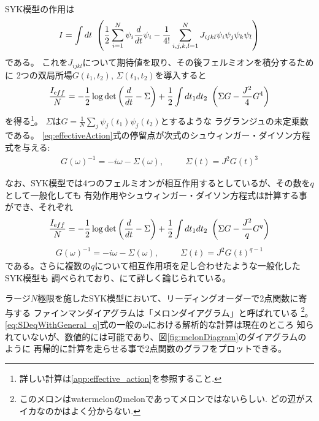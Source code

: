 SYK模型の作用は
\begin{align}
  I = \int dt\ \left(\frac{1}{2}\sum_{i = 1}^{N} \psi_i \frac{d}{dt} \psi_i
		- \frac{1}{4!} \sum_{i,j,k,l = 1}^{N} J_{ijkl} \psi_i\psi_j\psi_k\psi_l
    \right)
\end{align}
である。
これを$J_{ijkl}$について期待値を取り、その後フェルミオンを積分するために
2つの双局所場$G(t_1, t_2)$, $\Sigma(t_1, t_2)$を導入すると
\begin{align}
  \frac{I_{\mathrm eff}}{N} =
		- \frac{1}{2}\log\det\left(\frac{d}{dt} - \Sigma\right)
		+ \frac{1}{2}\int dt_1dt_2\ \left(\Sigma G - \frac{J^2}{4}G^4\right)
  \label{eq:effectiveAction}
\end{align}
を得る\footnote{詳しい計算は\ref{app:effective_action}を参照すること.}。
$\Sigma$は$G = \frac{1}{N}\sum_j \psi_j(t_1)\psi_j(t_2)$とするような
ラグランジュの未定乗数である。
\eqref{eq:effectiveAction}式の停留点が次式のシュウィンガー・ダイソン方程式を与える:
\begin{align}
  G(\omega)^{-1} = -i\omega - \Sigma(\omega),
  \hspace{30pt}
  \Sigma(t) = J^2G(t)^3
  \label{eq:SDeq}
\end{align}

なお、SYK模型では4つのフェルミオンが相互作用するとしているが、その数を$q$として一般化しても
有効作用やシュウィンガー・ダイソン方程式は計算する事ができ、それぞれ
\begin{align}
  \frac{I_{\mathrm eff}}{N} =
		- \frac{1}{2}\log\det\left(\frac{d}{dt} - \Sigma\right)
		+ \frac{1}{2}\int dt_1dt_2\ \left(\Sigma G - \frac{J^2}{q}G^q\right)
  \label{eq:effectiveActionWithGeneral_q}
\end{align}
\begin{align}
  G(\omega)^{-1} = -i\omega - \Sigma(\omega),
  \hspace{30pt}
  \Sigma(t) = J^2G(t)^{q-1}
  \label{eq:SDeqWithGeneral_q}
\end{align}
である。さらに複数の$q$について相互作用項を足し合わせたような一般化したSYK模型も
調べられており、\cite{gross}にて詳しく論じられている。

ラージ$N$極限を施したSYK模型において、リーディングオーダーで2点関数に寄与する
ファインマンダイアグラムは「メロンダイアグラム」と呼ばれている
\footnote{このメロンはwatermelonのmelonであってメロンではないらしい.
どの辺がスイカなのかはよく分からない.}。
\eqref{eq:SDeqWithGeneral_q}式の一般の$\omega$における解析的な計算は現在のところ
知られていないが、数値的には可能であり、図\ref{fig:melonDiagram}のダイアグラムのように
再帰的に計算を走らせる事で2点関数のグラフをプロットできる。

